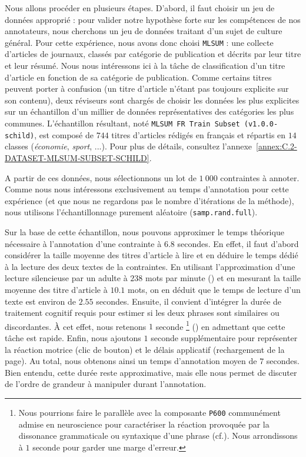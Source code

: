 			Nous allons procéder en plusieurs étapes.
			D'abord, il faut choisir un jeu de données approprié : pour valider notre hypothèse forte sur les compétences de nos annotateurs, nous cherchons un jeu de données traitant d'un sujet de culture général.
			Pour cette expérience, nous avons donc choisi \texttt{MLSUM} : une collecte d'articles de journaux, classés par catégorie de publication et décrits par leur titre et leur résumé.
			Nous nous intéressons ici à la tâche de classification d'un titre d'article en fonction de sa catégorie de publication.
			Comme certains titres peuvent porter à confusion (un titre d'article n'étant pas toujours explicite sur son contenu), deux réviseurs sont chargés de choisir les données les plus explicites sur un échantillon d'un millier de données représentatives des catégories les plus communes.
			L'échantillon résultant, noté \texttt{MLSUM FR Train Subset (v1.0.0-schild)}, est composé de $744$ titres d'articles rédigés en français et répartis en $14$ classes (\textit{économie}, \textit{sport}, ...).
			Pour plus de détails, consultez l'annexe~\ref{annex:C.2-DATASET-MLSUM-SUBSET-SCHILD}.
			
			A partir de ces données, nous sélectionnons un lot de $1~000$ contraintes à annoter.
			Comme nous nous intéressons exclusivement au temps d'annotation pour cette expérience (et que nous ne regardons pas le nombre d'itérations de la méthode), nous utilisons l'échantillonnage purement aléatoire (\texttt{samp.rand.full}).
			
			Sur la base de cette échantillon, nous pouvons approximer le temps théorique nécessaire à l'annotation d'une contrainte à $6.8$ secondes.
			En effet, il faut d'abord considérer la taille moyenne des titres d'article à lire et en déduire le temps dédié à la lecture des deux textes de la contraintes.
			En utilisant l'approximation d'une lecture silencieuse par un adulte à $238$ mots par minute (\cite{brysbaert:2019:how-many-words}) et en mesurant la taille moyenne des titre d'article à $10.1$ mots, on en déduit que le temps de lecture d'un texte est environ de $2.55$ secondes.
			Ensuite, il convient d'intégrer la durée de traitement cognitif requis pour estimer si les deux phrases sont similaires ou discordantes.
			À cet effet, nous retenons $1$ seconde
			\footnote{Nous pourrions faire le parallèle avec la composante \texttt{P600} communément admise en neuroscience pour caractériser la réaction provoquée par la dissonance grammaticale ou syntaxique d'une phrase (cf.). Nous arrondissons à $1$ seconde pour garder une marge d'erreur.
			} (\cite{purves-brannon:2013:principles-cognitive-neuroscience})
			en admettant que cette tâche est rapide.
			Enfin, nous ajoutons $1$ seconde supplémentaire pour représenter la réaction motrice (clic de bouton) et le délais applicatif (rechargement de la page).
			Au total, nous obtenons ainsi un temps d'annotation moyen de $7$ secondes.
			Bien entendu, cette durée reste approximative, mais elle nous permet de discuter de l'ordre de grandeur à manipuler durant l'annotation.
			
